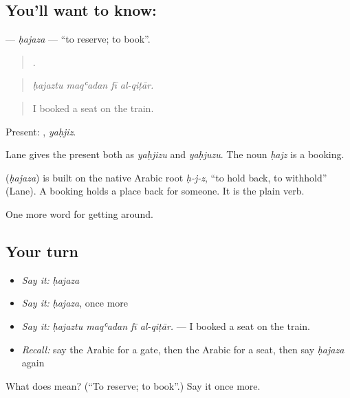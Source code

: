 \subsection*{You'll want to know: }
\textbf{} — \emph{ḥajaza} — \textquotedblleft{}to reserve; to book\textquotedblright{}.

\begin{quote}
   .
\end{quote}

\begin{quote}
\emph{ḥajaztu maqʿadan fī al-qiṭār.}
\end{quote}

\begin{quote}
I booked a seat on the train.
\end{quote}

Present: , \emph{yaḥjiz}.

Lane gives the present both as \emph{yaḥjizu} and \emph{yaḥjuzu}. The noun \emph{ḥajz} is a booking.

\begin{cousinweb}
\textbf{} (\emph{ḥajaza}) is built on the native Arabic root \emph{ḥ-j-z}, \textquotedblleft{}to hold back, to withhold\textquotedblright{} (Lane). A booking holds a place back for someone. It is the plain verb.
\end{cousinweb}

\begin{grammarlens}[title={What you've built}]
One more word for getting around.
\end{grammarlens}

\subsection*{Your turn}
\begin{itemize}
\raggedright
  \item \emph{Say it:} \emph{ḥajaza}
  \item \emph{Say it:} \emph{ḥajaza}, once more
  \item \emph{Say it:} \emph{ḥajaztu maqʿadan fī al-qiṭār.} — I booked a seat on the train.
  \item \emph{Recall:} say the Arabic for a gate, then the Arabic for a seat, then say \emph{ḥajaza} again
\end{itemize}

\begin{tcolorbox}[breakable,colback=teal!4,colframe=teal!35!black,title={Before you move on}]
What does  mean? (\textquotedblleft{}To reserve; to book\textquotedblright{}.) Say it once more.
\end{tcolorbox}
